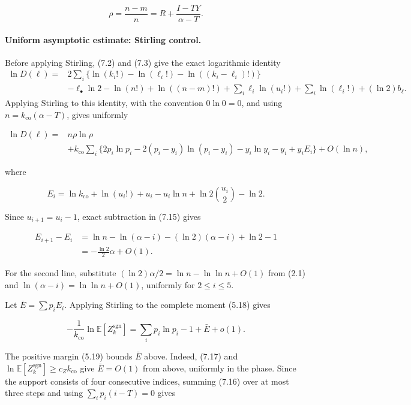 \documentclass[11pt,reqno]{amsart}
\newcommand{\Exp}[1]{\mathbb{E}\!\left[#1\right]}
\begin{document}
\[
 \rho=\frac{n-m}{n}
 =R+\frac{I-TY}{\alpha-T}.                              \tag{7.13}
\]

\paragraph{Uniform asymptotic estimate: Stirling control.}
Before applying Stirling, (7.2) and (7.3) give the exact logarithmic
identity
\[
\begin{split}
\ln D(\ell)={}&
2\sum_i\{\ln(k_i!)-\ln(\ell_i!)-\ln((k_i-\ell_i)!)\}\\
&-\ell_\bullet\ln 2-\ln(n!)+\ln((n-m)!)
 +\sum_i\ell_i\ln(u_i!)+\sum_i\ln(\ell_i!)
 +(\ln 2)b_\ell.
\end{split}
\]
Applying Stirling to this identity, with the convention
\(0\ln0=0\), and using \(n=k_{\mathrm{co}}(\alpha-T)\), gives uniformly

\[
\begin{split}
 \ln D(\ell)={}&n\rho\ln\rho\\
 &+k_{\mathrm{co}}\sum_i\{2p_i\ln p_i-2(p_i-y_i)\ln(p_i-y_i)
                  -y_i\ln y_i-y_i+y_iE_i\}+O({\ln n}),        \end{split}
\tag{7.14}
\]

where

\[
 E_i=\ln k_{\mathrm{co}}+\ln(u_i!)+u_i-u_i{\ln n}
       +{\ln 2}\binom{u_i}{2}-{\ln 2}.                               \tag{7.15}
\]

Since \(u_{i+1}=u_i-1\), exact subtraction in (7.15) gives

\[
 \begin{aligned}
 E_{i+1}-E_i
 &=\ln n-\ln(\alpha-i)-(\ln 2)(\alpha-i)+\ln 2-1\\
 &=-\frac{\ln 2}{2}\alpha+O(1).
 \end{aligned}                                                 \tag{7.16}
\]

For the second line, substitute
\((\ln 2)\alpha/2=\ln n-\ln\ln n+O(1)\) from (2.1) and
\(\ln(\alpha-i)=\ln\ln n+O(1)\), uniformly for \(2\le i\le5\).

Let \(\bar E=\sum p_i E_i\). Applying Stirling to the complete
moment (5.18) gives

\[
 -\frac1{k_{\mathrm{co}}}\ln \Exp{Z_k^{\mathrm{sgn}}}
 =\sum_i p_i\ln p_i-1+\bar E+o(1).                      \tag{7.17}
\]

The positive margin (5.19) bounds \(\bar E\) above.  Indeed, (7.17)
and \(\ln\Exp{Z_k^{\mathrm{sgn}}}\ge c_Zk_{\mathrm{co}}\)
give \(\bar E=O(1)\) from above, uniformly in the phase.  Since the
support consists of four consecutive indices, summing (7.16) over at
most three steps and using \(\sum_i p_i(i-T)=0\) gives
\end{document}

